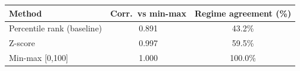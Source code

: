\begin{tabular}{lcc}
\toprule
Method & Corr.\ vs min-max & Regime agreement (\%) \\
\midrule
Percentile rank (baseline) & 0.891 & 43.2\% \\
Z-score & 0.997 & 59.5\% \\
Min-max [0,100] & 1.000 & 100.0\% \\
\bottomrule
\end{tabular}
